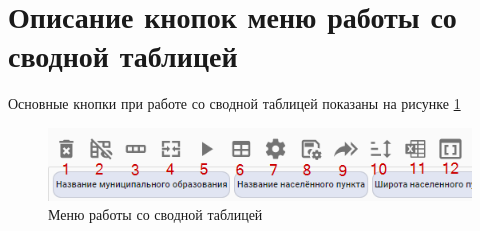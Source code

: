 \documentclass[../user-manual.tex]{subfiles}
\begin{document}
	\section{Описание кнопок меню работы со сводной таблицей}
	
	
	Основные кнопки при работе со сводной таблицей показаны на рисунке  \ref{fig:pivot-menu}

	\begin{figure}[h]
		\centering
		\includegraphics[width=\graphicswidth]{img/pivot-menu.png}
		\caption{Меню работы со сводной таблицей}
		\label{fig:pivot-menu}
	\end{figure}	
	
\end{document}
